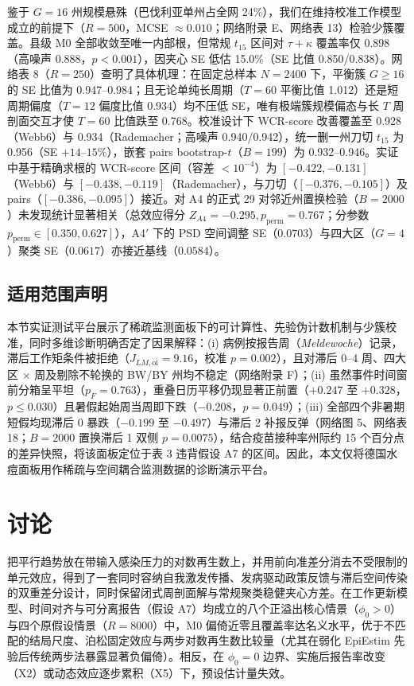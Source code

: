 \documentclass[11pt,a4paper]{ctexart}
\theoremstyle{definition}
\begin{document}
鉴于 $G=16$ 州规模悬殊（巴伐利亚单州占全网 24\%），我们在维持校准工作模型成立的前提下（$R=500$，MCSE $\approx 0.010$；网络附录 E、网络表 13）检验少簇覆盖。县级 M0 全部收敛至唯一内部根，但常规 $t_{15}$ 区间对 $\tau+\kappa$ 覆盖率仅 0.898（高噪声 0.888，$p<0.001$），因夹心 SE 低估 15.0\%（SE 比值 0.850/0.838）。网络表 8（$R=250$）查明了具体机理：在固定总样本 $N=2400$ 下，平衡簇 $G\ge 16$ 的 SE 比值为 0.947--0.984；且无论单纯长周期（$T=60$ 平衡比值 1.012）还是短周期偏度（$T=12$ 偏度比值 0.934）均不压低 SE，唯有极端簇规模偏态与长 $T$ 周剖面交互才使 $T=60$ 比值跌至 0.768。校准设计下 WCR-score 改善覆盖至 0.928（Webb6）与 0.934（Rademacher；高噪声 0.940/0.942），统一删一州刀切 $t_{15}$ 为 0.956（SE $+14$--$15\%$），嵌套 pairs bootstrap-$t$（$B=199$）为 0.932--0.946。实证中基于精确求根的 WCR-score 区间（容差 $<10^{-4}$）为 $[-0.422,-0.131]$（Webb6）与 $[-0.438,-0.119]$（Rademacher），与刀切（$[-0.376,-0.105]$）及 pairs（$[-0.386,-0.095]$）接近。对 A4 的正式 29 对邻近州置换检验（$B=2000$）未发现统计显著相关（总效应得分 $Z_{A4}=-0.295, p_{\mathrm{perm}}=0.767$；分参数 $p_{\mathrm{perm}}\in[0.350,0.627]$），A4$'$ 下的 PSD 空间调整 SE（$0.0703$）与四大区（$G=4$）聚类 SE（$0.0617$）亦接近基线（$0.0584$）。

\subsection{适用范围声明}

本节实证测试平台展示了稀疏监测面板下的可计算性、先验伪计数机制与少簇校准，同时多维诊断明确否定了因果解释：(i) 病例按报告周（\emph{Meldewoche}）记录，滞后工作矩条件被拒绝（$J_{LM,\mathrm{oi}}=9.16$，校准 $p=0.002$），且对滞后 0--4 周、四大区 $\times$ 周及剔除不轮换的 BW/BY 州均不稳定（网络附录 F）；(ii) 虽然事件时间窗前分箱呈平坦（$p_F=0.763$），重叠日历平移仍现显著正前置（$+0.247$ 至 $+0.328$，$p\le 0.030$）且暑假起始周当周即下跌（$-0.208$，$p=0.049$）；(iii) 全部四个非暑期短假均现滞后 0 暴跌（$-0.199$ 至 $-0.497$）与滞后 2 补报反弹（网络图 5、网络表 18；$B=2000$ 置换滞后 1 双侧 $p=0.0075$），结合疫苗接种率州际约 15 个百分点的差异快照\citep{siedler2010varicella,reuss2010varicella,rieck2020impfquoten}，将该面板定位于表 3 违背假设 A7 的区间。因此，本文仅将德国水痘面板用作稀疏与空间耦合监测数据的诊断演示平台。

\section{讨论}
\label{s:discussion}

把平行趋势放在带输入感染压力的对数再生数上，并用前向准差分消去不受限制的单元效应，得到了一套同时容纳自我激发传播、发病驱动政策反馈与滞后空间传染的双重差分设计，同时保留闭式周剖面解与常规聚类稳健夹心方差。在工作更新模型、时间对齐与可分离报告（假设 A7）均成立的八个正溢出核心情景（$\phi_0>0$）与四个原假设情景（$R=8000$）中，M0 偏倚近零且覆盖率达名义水平，优于不匹配的结局尺度、泊松固定效应与两步对数再生数比较量（尤其在弱化 EpiEstim 先验后传统两步法暴露显著负偏倚）。相反，在 $\phi_0=0$ 边界、实施后报告率改变（X2）或动态效应逐步累积（X5）下，预设估计量失效。
\end{document}
